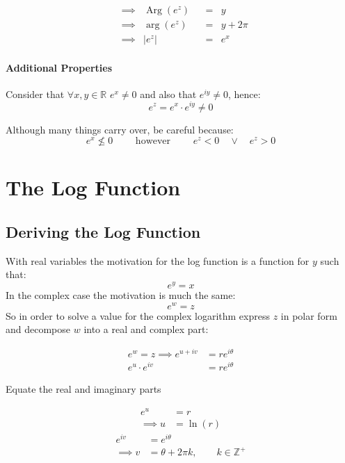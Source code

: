 \documentclass[class=article, crop=false]{standalone}
\begin{document}
    \begin{alignat*}{5}
    & \implies  &\operatorname{Arg}\left( e^z \right)& &= &y\\
    & \implies  &\operatorname{arg}\left( e^z \right)& &= &y + 2\pi\\
    &  \implies      &\left| e^z \right|& &= &e^x
    \end{alignat*}

    \paragraph{Additional Properties}
    Consider that $\forall x,y \in \mathbb{R} $ $e^x \neq 0$ and also that $e^{iy} \neq 0$, hence:
    \[
      e^{z} = e^x \cdot e^{iy} \neq 0
    \]

    Although many things carry over, be careful because:
    \[
      e^x \nleq 0 \qquad \text{   however   } \qquad e^z < 0 \quad \vee  \quad  e^z > 0
    \]

\newpage

    \section{The Log Function}


    \subsection{Deriving the Log Function}
    With real variables the motivation for the log function is a function for $y$ such that:
    \[
    e^y = x
    \]
    In the complex case the motivation is much the same:
    \[
    e^w =  z
    \]
    So in order to solve a value for the complex logarithm express $z$ in polar form and decompose $w$ into a real and complex part:

   \begin{align*}
   e^w =  z  \implies   e^{u +  iv} &=  r e^{i\theta}\\
   	e^u \cdot  e^{iv} &=  re^{i\theta}
  	\end{align*}

        Equate the real and imaginary parts

\begin{multicols}{2}
  \begin{align*}
    e^u &= r\\
     \implies  u &= \ln{\left( r \right) }
  \end{align*}\break
  \begin{align*}
      e^{iv} &= e^{i\theta}\\
      \implies  v &=  \theta +  2\pi k, \qquad k \in \mathbb{Z}^+
  \end{align*}
\end{multicols}
\end{document}
